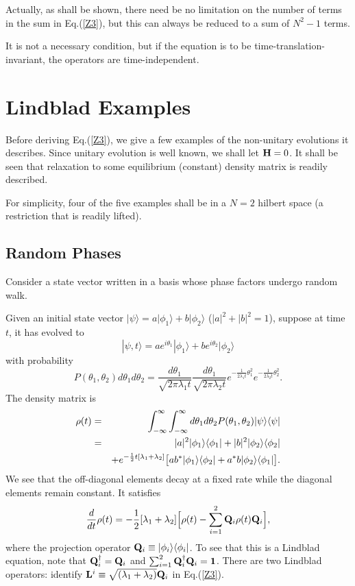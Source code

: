 \documentclass[aps,pra,amssymb, amsfonts,amsmath,showpacs, superscriptaddress,12pt]{revtex4}
\begin{document}
Actually, as shall be shown, there need be no limitation on the number of terms in the sum in Eq.(\ref{Z3}),  but this can always be reduced to a sum of 
$N^{2}-1$ terms.  

 It is not a necessary condition, but if the equation is to be time-translation-invariant, the operators are time-independent. 

\section{Lindblad Examples}

Before deriving Eq.(\ref{Z3}), we give a few examples of the non-unitary evolutions  it describes.   Since unitary evolution is well known, we shall let ${\bf H}=0$.  It shall be seen that relaxation to some equilibrium (constant) density matrix is readily described. 

For simplicity, four of the five examples shall be in a $N=2$ hilbert space (a restriction that is readily lifted).  

\subsection{Random Phases}
Consider a state vector written in a basis whose phase factors undergo random walk. 

Given an initial state vector $|\psi\rangle=a|\phi_{1}\rangle+b|\phi_{2}\rangle$ ($|a|^{2}+|b|^{2}=1$), suppose at time $t$, it has evolved to  
\[
|\psi,t\rangle=ae^{i\theta_{1}}|\phi_{1}\rangle+be^{i\theta_{2}}|\phi_{2}\rangle
\]
\noindent    with probability 
\[
P(\theta_{1}, \theta_{2})d\theta_{1}d \theta_{2}=\frac{d\theta_{1}}{\sqrt{2\pi\lambda_{1}t}}\frac{d\theta_{1}}{\sqrt{2\pi\lambda_{2}t}}e^{-\frac{1}{2\lambda_{1}t}\theta_{1}^{2}}e^{-\frac{1}{2\lambda_{2}t}\theta_{2}^{2}}. 
\] 
The density matrix is
\begin{eqnarray}
{\bf \rho}(t)&=&\int_{-\infty}^{\infty} \int_{-\infty}^{\infty}d\theta_{1}d\theta_{2}P(\theta_{1}, \theta_{2})
|\psi\rangle\langle\psi|\nonumber\\
&=&|a|^{2}|\phi_{1}\rangle\langle\phi_{1}|+|b|^{2}|\phi_{2}\rangle\langle\phi_{2}|\nonumber\\
&&+e^{-\frac{1}{2}t[\lambda_{1}+\lambda_{2}]}\big[ab^{*}|\phi_{1}\rangle\langle\phi_{2}|+a^{*}b|\phi_{2}\rangle\langle\phi_{1}|\big]. \nonumber
\end{eqnarray}
\noindent  We see that the off-diagonal elements decay at a fixed rate while the diagonal elements remain constant.  It satisfies 
\[
\frac{d}{dt}{\bf \rho}(t)=-\frac{1}{2}[\lambda_{1}+\lambda_{2}]\Big[{\bf \rho}(t)-\sum_{i=1}^{2}{\bf Q}_{i}{\bf \rho}(t){\bf Q}_{i}\Big],
\]
\noindent where the projection operator ${\bf Q}_{i}\equiv|\phi_{i}\rangle\langle\phi_{i}|$.  To see that this is a Lindblad equation, note that  
${\bf Q}_{i}^{\dagger}={\bf Q}_{i}$ and $\sum_{i=1}^{2} {\bf Q}_{i}^{\dagger}{\bf Q}_{i}={\bf 1}$. There are two Lindblad operators:  identify ${\bf L}^{i}\equiv\sqrt{(\lambda_{1}+\lambda_{2})}{\bf Q}_{i}$ 
in Eq.(\ref{Z3}).
\end{document}
